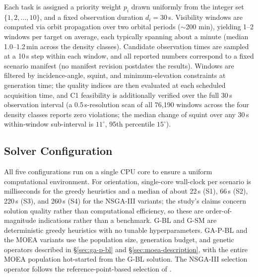 \documentclass[preprint,12pt,authoryear]{elsarticle}
\begin{document}
Each task is assigned a priority weight $p_i$ drawn uniformly from the integer set $\{1, 2, \dots, 10\}$, and a fixed observation
duration $d_i = 30$\,s. Visibility windows are computed via orbit propagation over two orbital periods
($\sim$200 min), yielding 1--2 windows per target on average, each
typically spanning about a minute (median 1.0--1.2\,min across the density
classes). Candidate observation times are sampled at a 10\,s step
within each window, and all reported numbers correspond to a fixed scenario
manifest (no manifest revision postdates the results). Windows are filtered by incidence-angle,
squint, and minimum-elevation constraints at generation time; the quality
indices are then evaluated at each scheduled acquisition time, and C1
feasibility is additionally verified over the full 30\,s observation
interval (a 0.5\,s-resolution scan of all 76{,}190 windows across the four
density classes reports zero violations; the median change of squint over
any 30\,s within-window sub-interval is $11^\circ$, 95th percentile
$15^\circ$).
\subsection{Solver Configuration}
All five configurations run on a single CPU core to ensure a uniform computational environment. For orientation, single-core wall-clock per scenario is milliseconds for the greedy heuristics and a median of about 22\,s (S1), 66\,s (S2), 220\,s (S3), and 260\,s (S4) for the NSGA-III variants; the study's claims concern solution quality rather than computational efficiency, so these are order-of-magnitude indications rather than a benchmark.
G-BL and G-SM are deterministic greedy heuristics with no tunable
hyperparameters. GA-P-BL and the MOEA variants use the population size,
generation budget, and genetic operators described in \S\ref{sec:ga-p-bl}
and \S\ref{sec:moea-description}, with the entire MOEA population
hot-started from the G-BL solution. The NSGA-III selection operator follows
the reference-point-based selection of \citet{Deb2014}.
\end{document}
